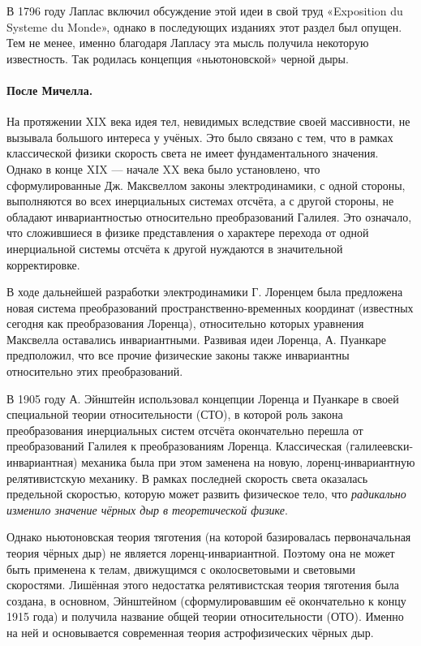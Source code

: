 \documentclass[a4paper, 12pt]{extarticle}
\begin{document}
  В 1796 году Лаплас включил обсуждение этой идеи в свой труд «Exposition du Systeme du Monde»,
  однако в последующих изданиях этот раздел был опущен. Тем не менее, именно благодаря Лапласу эта
  мысль получила некоторую известность. Так родилась концепция «ньютоновской» черной дыры.

  \paragraph{После Мичелла.} 
  На протяжении XIX века идея тел, невидимых вследствие своей массивности, не вызывала большого
  интереса у учёных. Это было связано с тем, что в рамках классической физики скорость света не
  имеет фундаментального значения. Однако в конце XIX — начале XX века было установлено, что
  сформулированные Дж. Максвеллом законы электродинамики, с одной стороны, выполняются во всех
  инерциальных системах отсчёта, а с другой стороны, не обладают инвариантностью относительно
  преобразований Галилея. Это означало, что сложившиеся в физике представления о характере перехода
  от одной инерциальной системы отсчёта к другой нуждаются в значительной корректировке.

  В ходе дальнейшей разработки электродинамики Г. Лоренцем была предложена новая система
  преобразований пространственно-временных координат (известных сегодня как преобразования Лоренца),
  относительно которых уравнения Максвелла оставались инвариантными. Развивая идеи Лоренца, А.
  Пуанкаре предположил, что все прочие физические законы также инвариантны относительно этих
  преобразований.

  В 1905 году А. Эйнштейн использовал концепции Лоренца и Пуанкаре в своей специальной теории
  относительности (СТО), в которой роль закона преобразования инерциальных систем отсчёта
  окончательно перешла от преобразований Галилея к преобразованиям Лоренца. Классическая
  (галилеевски-инвариантная) механика была при этом заменена на новую, лоренц-инвариантную
  релятивистскую механику. В рамках последней скорость света оказалась предельной скоростью, которую
  может развить физическое тело, что \emph{радикально изменило значение чёрных дыр в теоретической физике}.

  Однако ньютоновская теория тяготения (на которой базировалась первоначальная теория чёрных дыр) не
  является лоренц-инвариантной. Поэтому она не может быть применена к телам, движущимся с
  околосветовыми и световыми скоростями. Лишённая этого недостатка релятивистская теория тяготения
  была создана, в основном, Эйнштейном (сформулировавшим её окончательно к концу 1915 года) и
  получила название общей теории относительности (ОТО). Именно на ней и основывается современная
  теория астрофизических чёрных дыр.
\end{document}
